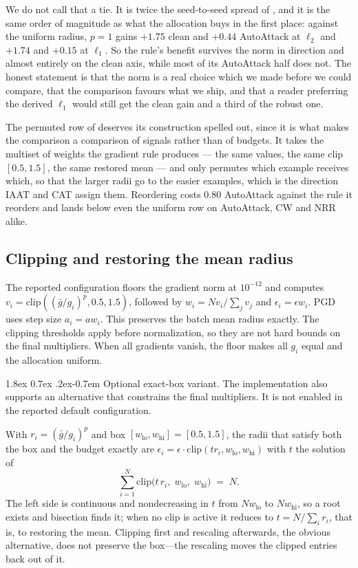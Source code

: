 \documentclass{article} %
\makeatletter
\theoremstyle{plain}
\renewcommand{\paragraph}{\@startsection{paragraph}{4}{\z@}%
  {1.8ex \@plus 0.7ex \@minus .2ex}{-0.7em}%
  {\normalfont\normalsize\bfseries}}
\makeatother
\begin{document}
We do not call that a tie. It is twice the seed-to-seed spread of , and it is the same
order of magnitude as what the allocation buys in the first place: against the uniform radius, $p = 1$
gains $+1.75$ clean and $+0.44$ AutoAttack at $\ell_2$ and $+1.74$ and $+0.15$ at $\ell_1$. So the
rule's benefit survives the norm in direction and almost entirely on the clean axis, while most of its
AutoAttack half does not. The honest statement is that the norm is a real choice which we made before
we could compare, that the comparison favours what we ship, and that a reader preferring the derived
$\ell_1$ would still get the clean gain and a third of the robust one.

The permuted row of  deserves its construction spelled out, since it is what makes
the comparison a comparison of signals rather than of budgets. It takes the multiset of weights the
gradient rule produces --- the same values, the same clip $[0.5, 1.5]$, the same restored mean --- and
only permutes which example receives which, so that the larger radii go to the easier examples, which
is the direction IAAT and CAT assign them. Reordering costs $0.80$ AutoAttack against the rule it
reorders and lands below even the uniform row on AutoAttack, CW and NRR alike.

\subsection{Clipping and restoring the mean radius}

The reported configuration floors the gradient norm at $10^{-12}$ and computes
$v_i=\mathrm{clip}((\bar g/g_i)^p,0.5,1.5)$, followed by
$w_i=Nv_i/\sum_jv_j$ and $\epsilon_i=\epsilon w_i$. PGD uses step size $a_i=aw_i$.
This preserves the batch mean radius exactly. The clipping thresholds apply before normalization,
so they are not hard bounds on the final multipliers. When all gradients vanish, the floor makes all
$g_i$ equal and the allocation uniform.

\paragraph{Optional exact-box variant.}
The implementation also supports an alternative that constrains the final multipliers. It is not
enabled in the reported default configuration.

With $r_i = (\bar g / g_i)^p$ and box $[w_{\mathrm{lo}}, w_{\mathrm{hi}}] = [0.5, 1.5]$, the radii that
satisfy both the box and the budget exactly are $\epsilon_i = \epsilon \cdot \mathrm{clip}(t r_i,
w_{\mathrm{lo}}, w_{\mathrm{hi}})$ with $t$ the solution of
\begin{equation}
\sum_{i=1}^{N} \mathrm{clip}\big(t\, r_i,\; w_{\mathrm{lo}},\; w_{\mathrm{hi}}\big) \;=\; N .
\label{eqn:box}
\end{equation}
The left side is continuous and nondecreasing in $t$ from $N w_{\mathrm{lo}}$ to $N w_{\mathrm{hi}}$,
so a root exists and bisection finds it; when no clip is active it reduces to $t = N / \sum_i r_i$,
that is, to restoring the mean. Clipping first and rescaling afterwards, the obvious alternative, does
not preserve the box---the rescaling moves the clipped entries back out of it.
\end{document}
